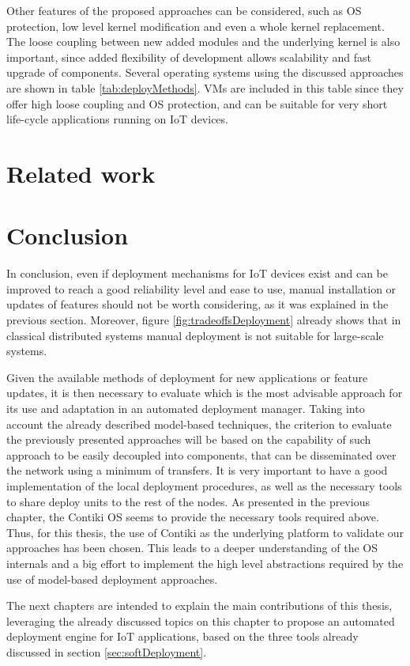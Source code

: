 Other features of the proposed approaches can be considered, such as OS protection, low level kernel modification and even a whole kernel replacement.
The loose coupling between new added modules and the underlying kernel is also important, since added flexibility of development allows scalability and fast upgrade of components.
Several operating systems using the discussed approaches are shown in table \ref{tab:deployMethods}.
VMs are included in this table since they offer high loose coupling and OS protection, and can be suitable for very short life-cycle applications running on IoT devices.

\section{Related work}


\section{Conclusion}
In conclusion, even if deployment mechanisms for IoT devices exist and can be improved to reach a good reliability level and ease to use, manual installation or updates of features should not be worth considering, as it was explained in the previous section.
Moreover, figure \ref{fig:tradeoffsDeployment} already shows that in classical distributed systems manual deployment is not suitable for large-scale systems.

Given the available methods of deployment for new applications or feature updates, it is then necessary to evaluate which is the most advisable approach for its use and adaptation in an automated deployment manager.
Taking into account the already described model-based techniques, the criterion to evaluate the previously presented approaches will be based on the capability of such approach to be easily decoupled into components, that can be disseminated over the network using a minimum of transfers.
It is very important to have a good implementation of the local deployment procedures, as well as the necessary tools to share deploy units to the rest of the nodes.
As presented in the previous chapter, the Contiki OS seems to provide the necessary tools required above.
Thus, for this thesis, the use of Contiki as the underlying platform to validate our approaches has been chosen.
This leads to a deeper understanding of the OS internals and a big effort to implement the high level abstractions required by the use of model-based deployment approaches.

The next chapters are intended to explain the main contributions of this thesis, leveraging the already discussed topics on this chapter to propose an automated deployment engine for IoT applications, based on the three tools already discussed in section \ref{sec:softDeployment}.